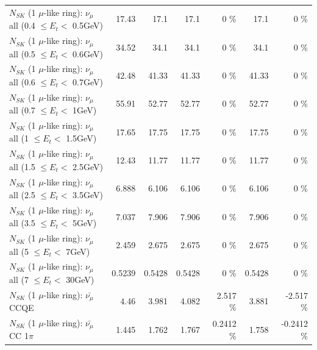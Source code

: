 \begin{table}
\begin{tabular}{| l | r | r | r  r | r  r |}
       $N_{SK}$ (1 $\mu$-like ring): $\nu_{\mu}$ all (0.4 $\leq E_{t} <$ 0.5GeV) &           17.43 &            17.1 &            17.1 &        0 \%  &            17.1 &        0 \%  \\ 
       $N_{SK}$ (1 $\mu$-like ring): $\nu_{\mu}$ all (0.5 $\leq E_{t} <$ 0.6GeV) &           34.52 &            34.1 &            34.1 &        0 \%  &            34.1 &        0 \%  \\ 
       $N_{SK}$ (1 $\mu$-like ring): $\nu_{\mu}$ all (0.6 $\leq E_{t} <$ 0.7GeV) &           42.48 &           41.33 &           41.33 &        0 \%  &           41.33 &        0 \%  \\ 
         $N_{SK}$ (1 $\mu$-like ring): $\nu_{\mu}$ all (0.7 $\leq E_{t} <$ 1GeV) &           55.91 &           52.77 &           52.77 &        0 \%  &           52.77 &        0 \%  \\ 
         $N_{SK}$ (1 $\mu$-like ring): $\nu_{\mu}$ all (1 $\leq E_{t} <$ 1.5GeV) &           17.65 &           17.75 &           17.75 &        0 \%  &           17.75 &        0 \%  \\ 
       $N_{SK}$ (1 $\mu$-like ring): $\nu_{\mu}$ all (1.5 $\leq E_{t} <$ 2.5GeV) &           12.43 &           11.77 &           11.77 &        0 \%  &           11.77 &        0 \%  \\ 
       $N_{SK}$ (1 $\mu$-like ring): $\nu_{\mu}$ all (2.5 $\leq E_{t} <$ 3.5GeV) &           6.888 &           6.106 &           6.106 &        0 \%  &           6.106 &        0 \%  \\ 
         $N_{SK}$ (1 $\mu$-like ring): $\nu_{\mu}$ all (3.5 $\leq E_{t} <$ 5GeV) &           7.037 &           7.906 &           7.906 &        0 \%  &           7.906 &        0 \%  \\ 
           $N_{SK}$ (1 $\mu$-like ring): $\nu_{\mu}$ all (5 $\leq E_{t} <$ 7GeV) &           2.459 &           2.675 &           2.675 &        0 \%  &           2.675 &        0 \%  \\ 
          $N_{SK}$ (1 $\mu$-like ring): $\nu_{\mu}$ all (7 $\leq E_{t} <$ 30GeV) &          0.5239 &          0.5428 &          0.5428 &        0 \%  &          0.5428 &        0 \%  \\ 
\hline
\hline
\hline
                              $N_{SK}$ (1 $\mu$-like ring): $\bar{\nu_\mu}$ CCQE &            4.46 &           3.981 &           4.082 &    2.517 \%  &           3.881 &   -2.517 \%  \\ 
                         $N_{SK}$ (1 $\mu$-like ring): $\bar{\nu_\mu}$ CC 1$\pi$ &           1.445 &           1.762 &           1.767 &   0.2412 \%  &           1.758 &  -0.2412 \%  \\ 

\end{tabular}
\end{table}
